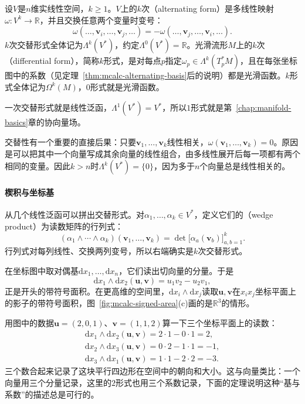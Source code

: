 \begin{definition}[交替形式与微分形式]
\label{def:mcalc-alternating-form}
设$V$是$n$维实线性空间，$k\geq1$。$V$上的$k$次（alternating form）是多线性映射$\omega:V^k\to\mathbb R$，并且交换任意两个变量时变号：
\begin{equation}
\omega(\ldots,\bm v_i,\ldots,\bm v_j,\ldots)=-\omega(\ldots,\bm v_j,\ldots,\bm v_i,\ldots).
\label{eq:mcalc-alternating}
\end{equation}
$k$次交替形式全体记为$\Lambda^k(V^*)$，约定$\Lambda^0(V^*)=\mathbb R$。光滑流形$M$上的$k$次（differential form），简称$k$形式，是对每点$p$指定$\omega_p\in\Lambda^k(T_p^*M)$，且在每张坐标图中的系数（见定理~\ref{thm:mcalc-alternating-basis}后的说明）都是光滑函数。$k$形式全体记为$\Omega^k(M)$，$0$形式就是光滑函数。
\end{definition}

一次交替形式就是线性泛函，$\Lambda^1(V^*)=V^*$，所以$1$形式就是第~\ref{chap:manifold-basics}章的协向量场。

交替性有一个重要的直接后果：只要$\bm v_1,\ldots,\bm v_k$线性相关，$\omega(\bm v_1,\ldots,\bm v_k)=0$。原因是可以把其中一个向量写成其余向量的线性组合，由多线性展开后每一项都有两个相同的变量。因此$k>n$时$\Lambda^k(V^*)=\{0\}$，因为多于$n$个向量总是线性相关的。

\paragraph{楔积与坐标基}
从几个线性泛函可以拼出交替形式。对$\alpha_1,\ldots,\alpha_k\in V^*$，定义它们的（wedge product）为读数矩阵的行列式：
\begin{equation}
(\alpha_1\wedge\cdots\wedge\alpha_k)(\bm v_1,\ldots,\bm v_k)=\det\bigl[\alpha_a(\bm v_b)\bigr]_{a,b=1}^k .
\label{eq:mcalc-wedge-determinant}
\end{equation}
行列式对每列线性、交换两列变号，所以右端确实是$k$次交替形式。

在坐标图中取对偶基$\mathrm dx_1,\ldots,\mathrm dx_n$，它们读出切向量的分量。于是
\[
\mathrm dx_1\wedge\mathrm dx_2(\bm u,\bm v)=u_1v_2-u_2v_1 ,
\]
正是开头的带符号面积。在更高维的空间里，$\mathrm dx_i\wedge\mathrm dx_j$读取$\bm u,\bm v$在$x_ix_j$坐标平面上的影子的带符号面积，图~\ref{fig:mcalc-signed-area}(c)画的是$\mathbb R^3$的情形。

用图中的数据$\bm u=(2,0,1)$、$\bm v=(1,1,2)$算一下三个坐标平面上的读数：
\[
\begin{gathered}
\mathrm dx_1\wedge\mathrm dx_2(\bm u,\bm v)=2\cdot1-0\cdot1=2,\\
\mathrm dx_2\wedge\mathrm dx_3(\bm u,\bm v)=0\cdot2-1\cdot1=-1,\\
\mathrm dx_3\wedge\mathrm dx_1(\bm u,\bm v)=1\cdot1-2\cdot2=-3.
\end{gathered}
\]
三个数合起来记录了这块平行四边形在空间中的朝向和大小。这与向量类比：一个向量用三个分量记录，这里的$2$形式也用三个系数记录，下面的定理说明这种“基与系数”的描述总是可行的。

